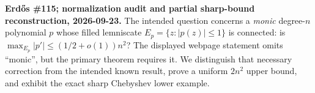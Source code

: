 \textbf{Erd\H{o}s \#115; normalization audit and partial sharp-bound reconstruction, 2026-09-23.}
The intended question concerns a \emph{monic} degree-$n$ polynomial $p$ whose filled lemniscate $E_p=\{z:|p(z)|\leq1\}$ is connected: is $\max_{E_p}|p'|\leq(1/2+o(1))n^2$? The displayed webpage statement omits ``monic'', but the primary theorem requires it. We distinguish that necessary correction from the intended known result, prove a uniform $2n^2$ upper bound, and exhibit the exact sharp Chebyshev lower example.
